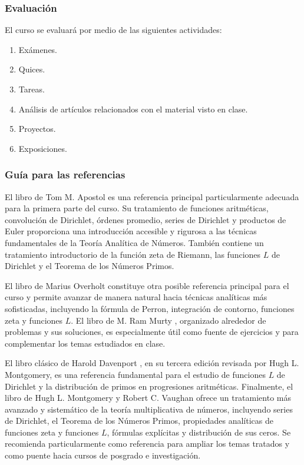 \begin{refsection}
\subsubsection*{Evaluación}

El curso se evaluará por medio de las siguientes actividades:

\begin{enumerate}
\item Exámenes.
\item Quices.
\item Tareas.
\item Análisis de artículos relacionados con el material visto en clase.
\item Proyectos.
\item Exposiciones.
\end{enumerate}

\subsubsection*{Guía para las referencias}

El libro de Tom M. Apostol \cite{Apostol76} es una referencia principal particularmente adecuada para la primera parte del curso. Su tratamiento de funciones aritméticas, convolución de Dirichlet, órdenes promedio, series de Dirichlet y productos de Euler proporciona una introducción accesible y rigurosa a las técnicas fundamentales de la Teoría Analítica de Números. También contiene un tratamiento introductorio de la función zeta de Riemann, las funciones $L$ de Dirichlet y el Teorema de los Números Primos.

El libro de Marius Overholt \cite{Ove15} constituye otra posible referencia principal para el curso y permite avanzar de manera natural hacia técnicas analíticas más sofisticadas, incluyendo la fórmula de Perron, integración de contorno, funciones zeta y funciones $L$. El libro de M. Ram Murty \cite{Mur08}, organizado alrededor de problemas y sus soluciones, es especialmente útil como fuente de ejercicios y para complementar los temas estudiados en clase.

El libro clásico de Harold Davenport \cite{Dav00}, en su tercera edición revisada por Hugh L. Montgomery, es una referencia fundamental para el estudio de funciones $L$ de Dirichlet y la distribución de primos en progresiones aritméticas. Finalmente, el libro de Hugh L. Montgomery y Robert C. Vaughan \cite{MV07} ofrece un tratamiento más avanzado y sistemático de la teoría multiplicativa de números, incluyendo series de Dirichlet, el Teorema de los Números Primos, propiedades analíticas de funciones zeta y funciones $L$, fórmulas explícitas y distribución de sus ceros. Se recomienda particularmente como referencia para ampliar los temas tratados y como puente hacia cursos de posgrado e investigación.

\nocite{Apostol76}
\nocite{Dav00}
\nocite{Ove15}
\nocite{Mur08}
\nocite{MV07}

\printcursosbibliography
\end{refsection}
